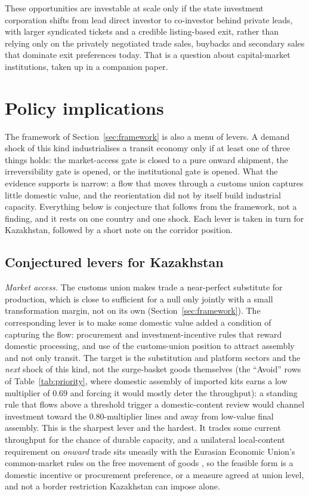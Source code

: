 \documentclass[12pt]{article}
\begin{document}
These opportunities are investable at scale only if the state investment corporation shifts
from lead direct investor to co-investor behind private leads, with larger syndicated tickets
and a credible listing-based exit, rather than relying only on the privately negotiated trade
sales, buybacks and secondary sales that dominate exit preferences today. That is a question
about capital-market institutions, taken up in a companion paper.

\section{Policy implications}\label{sec:policy}

The framework of Section~\ref{sec:framework} is also a menu of levers. A demand shock of this
kind industrialises a transit economy only if at least one of three things holds: the market-access gate is closed to a pure onward shipment, the irreversibility gate is opened, or the
institutional gate is opened. What the evidence supports is narrow: a flow that moves through a customs union captures little domestic value, and the reorientation did not by itself build industrial capacity. Everything below is conjecture that follows from the framework, not a finding, and it rests on one country and one shock. Each lever is taken in turn for Kazakhstan, followed by a short note on the corridor position.

\subsection{Conjectured levers for Kazakhstan}

\emph{Market access.} The customs union makes trade a near-perfect substitute for production,
which is close to sufficient for a null only jointly with a small transformation margin, not
on its own (Section~\ref{sec:framework}). The corresponding lever is to make some
domestic value added a condition of capturing the flow: procurement and investment-incentive
rules that reward domestic processing, and use of the customs-union position to attract
assembly and not only transit. The target is the substitution and platform sectors and the
\emph{next} shock of this kind, not the surge-basket goods themselves (the
``Avoid'' rows of Table~\ref{tab:priority}, where domestic assembly of imported kits earns a
low multiplier of $0.69$ and forcing it would mostly deter the throughput): a standing rule
that flows above a threshold trigger a domestic-content review would channel investment toward
the $0.80$-multiplier lines and away from low-value final assembly. This is the sharpest
lever and the hardest. It trades some current throughput for the chance of
durable capacity, and a unilateral local-content requirement on \emph{onward} trade sits
uneasily with the Eurasian Economic Union's common-market rules on the free movement of goods
\citep{eaeu2014treaty}, so the feasible form is a domestic incentive or procurement
preference, or a measure agreed at union level, and not a border restriction Kazakhstan can
impose alone.
\end{document}
